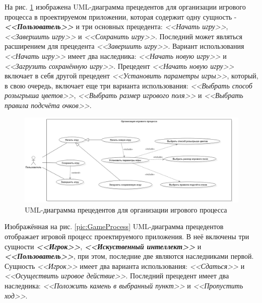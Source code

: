 На рис. \ref{pic:GameOrganisation} изображена UML-диаграмма прецедентов для организации игрового процесса в проектируемом приложении, которая содержит одну сущность - \textbf{\textit{<<Пользователь>>}} и три основных прецедента: \textit{<<Начать игру>>}, \textit{<<Завершить игру>>} и \textit{<<Сохранить игру>>}. Последний может являться расширением для прецедента \textit{<<Завершить игру>>}. Вариант использования \textit{<<Начать игру>>} имеет два наследника:  \textit{<<Начать новую игру>>} и \textit{<<Загрузить сохранённую игру>>}. Прецедент \textit{<<Начать новую игру>>} включает в себя другой прецедент \textit{<<Установить параметры игры>>}, который, в свою очередь, включает еще три варианта использования: \textit{<<Выбрать способ розыгрыша цветов>>}, \textit{<<Выбрать размер игрового поля>>} и \textit{<<Выбрать правила подсчёта очков>>}.\\

\begin{figure}[H]
	\begin{center}
		\includegraphics[scale=0.65]{../UMLdiagrams/UseCase/GameOrganisation.png}
		\caption{UML-диаграмма прецедентов для организации игрового процесса} 
		\label{pic:GameOrganisation}
	\end{center}
\end{figure}

Изображённая на рис. \ref{pic:GameProcess} UML-диаграмма прецедентов отображает игровой процесс проектируемого приложения. В неё включены три сущности \textbf{\textit{<<Игрок>>}}, \textbf{\textit{<<Искуственный интеллект>>}} и  \textbf{\textit{<<Пользователь>>}}, при этом, последние две являются наследниками первой. Сущность \textit{<<Игрок>>} имеет два варианта использования: \textit{<<Сдаться>>} и \textit{<<Осуществить игровое действие>>}. Последний прецедент имеет два наследника: \textit{<<Положить камень в выбранный пункт>>} и \textit{<<Пропустить ход>>}.\\


